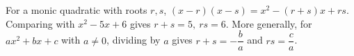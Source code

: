 For a monic quadratic with roots $r,s$, $(x-r)(x-s)=x^2-(r+s)x+rs$. Comparing with $x^2-5x+6$ gives $\boxed{r+s=5,\ rs=6}$. More generally, for $ax^2+bx+c$ with $a\ne0$, dividing by $a$ gives $r+s=-\dfrac{b}{a}$ and $rs=\dfrac{c}{a}$.
